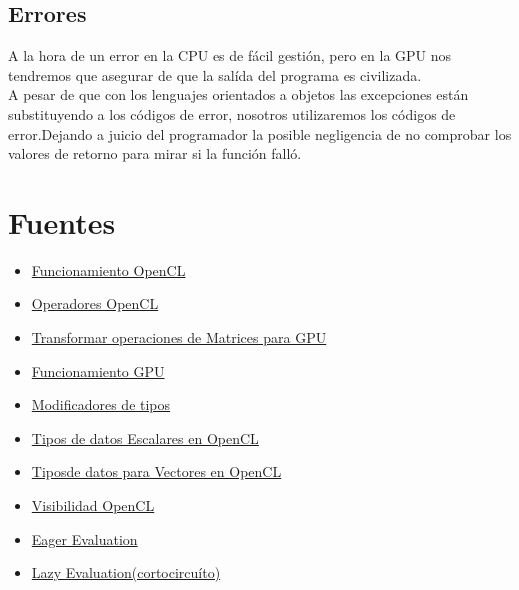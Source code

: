 \documentclass[12pt,a4paper]{article}
\begin{document}
\subsection{Errores}
A la hora de un error en la CPU es de fácil gestión, pero en la GPU nos
tendremos que asegurar de que la salída del programa es civilizada.\\
A pesar de que con los lenguajes orientados a objetos las excepciones están substituyendo a los códigos de error, nosotros utilizaremos los códigos de error.Dejando a juicio del programador la posible negligencia de no comprobar los valores de retorno para mirar si la función falló.
\section{Fuentes}
\begin{itemize}
\item \href{https://www.khronos.org/assets/uploads/developers/library/overview/opencl_overview.pdf}{ Funcionamiento OpenCL}
\item \href{https://www.khronos.org/registry/cl/sdk/2.0/docs/man/xhtml/operators.html}{Operadores OpenCL}
\item \href{http://gpgpu-computing4.blogspot.com.es/2009/09/matrix-multiplication-2-opencl.html}{Transformar operaciones de Matrices para GPU}
\item \href{https://www.khronos.org/assets/uploads/developers/library/overview/opencl_overview.pdf#page=8}{Funcionamiento GPU}
\item \href{https://www.khronos.org/registry/cl/specs/opencl-2.0-openclc.pdf#page=51}{Modificadores de tipos}
\item \href{https://www.khronos.org/registry/cl/specs/opencl-2.0-openclc.pdf#page=6}{Tipos de datos Escalares en OpenCL}
\item \href{https://www.khronos.org/registry/cl/specs/opencl-2.0-openclc.pdf#page=9}{Tiposde datos para Vectores en OpenCL}
\item \href{https://www.khronos.org/registry/cl/specs/opencl-2.0-openclc.pdf#page=50}{Visibilidad OpenCL}
\item \href{http://en.wikipedia.org/wiki/Eager_evaluation}{Eager Evaluation}
\item \href{http://en.wikipedia.org/wiki/Lazy_evaluation}{Lazy Evaluation(cortocircuíto)}
\end{itemize}
\end{document}
